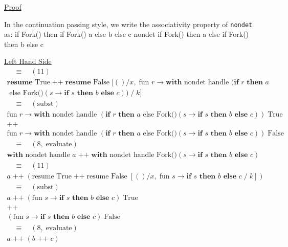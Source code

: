 \documentclass[logo,bsc,singlespacing,parskip]{infthesis}
\begin{document}
\underline{Proof}

In the continuation passing style, we  write the associativity property of \lstinline{nondet} as:
{
if Fork() then
if Fork() 
a 
else 
b 
else 
c
}
{nondet}
{
if Fork() then a 
else 
if Fork() 
 then b 
 else c
}

\underline{Left Hand Side}
\[
\begin{array}{l}
\quad \equiv \quad (11) \\[5pt]
\textbf{resume }\text{True} \;\texttt{++}\; \textbf{resume } \text{False} \; [()/x,\; \text{fun } r \rightarrow \textbf{with } \text{nondet handle } (\textbf{if } r \textbf{ then } a \\ \text{ else Fork()}(s \rightarrow \textbf{if }  s \textbf{ then } b \textbf{ else } c)) \;/\; k] \\[5pt]

\quad \equiv \quad (\text{subst}) \\[5pt]
\text{fun } r \rightarrow \textbf{with } \text{nondet handle } (\textbf{if } r \textbf{ then } a \text{ else Fork()}(s \rightarrow \textbf{if } s \textbf{ then } b \textbf{ else } c)) \;\text{True} \\[2pt]
\texttt{++} \\ 
\text{fun } r \rightarrow \textbf{with } \text{nondet handle } (\textbf{if } r \textbf{ then } a \text{ else Fork()}(s \rightarrow \textbf{if } s \textbf{ then } b \textbf{ else } c)) \;\text{False} \\[5pt]

\quad \equiv \quad (8,\; \text{evaluate}) \\[5pt]
\textbf{with } \text{nondet handle } a \;\texttt{++}\; \textbf{with } \text{nondet handle } \text{Fork()}(s \rightarrow \textbf{if } s \textbf{ then } b \textbf{ else } c) \\[5pt]

\quad \equiv \quad (11) \\[5pt]
a \;\texttt{++}\; (\text{resume True} \;\texttt{++}\; \text{resume False} \; [()/x,\; \text{fun } s \rightarrow \textbf{if } s \textbf{ then } b \textbf{ else } c \;/\; k]) \\[5pt]

\quad \equiv \quad (\text{subst}) \\[5pt]
a \;\texttt{++}\; (\text{fun } s \rightarrow \textbf{if } s \textbf{ then } b \textbf{ else } c) \;\text{True} \\
\texttt{++} \\
(\text{fun } s \rightarrow \textbf{if } s \textbf{ then } b \textbf{ else } c) \;\text{False} \\[5pt]

\quad \equiv \quad (8,\; \text{evaluate}) \\[5pt]
a \;\texttt{++}\; (b \;\texttt{++}\; c)
\end{array}
\]
\end{document}
